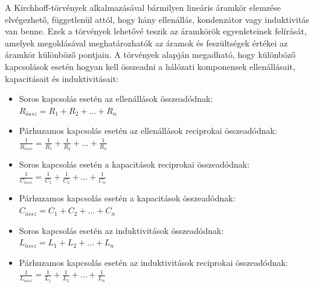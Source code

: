 \documentclass[../main.tex]{subfiles}
\begin{document}
A Kirchhoff-törvények alkalmazásával bármilyen lineáris áramkör elemzése elvégezhető, függetlenül attól, hogy hány ellenállás, kondenzátor vagy induktivitás van benne. Ezek a törvények lehetővé teszik az áramkörök egyenleteinek felírását, amelyek megoldásával meghatározhatók az áramok és feszültségek értékei az áramkör különböző pontjain.
A törvények alapján megadható, hogy különböző kapcsolások esetén hogyan kell összeadni a hálózati komponensek ellenállásait, kapacitásait és induktivitásait:
\begin{itemize}
    \item Soros kapcsolás esetén az ellenállások összeadódnak: $R_{össz} = R_1 + R_2 + \ldots + R_n$
    \item Párhuzamos kapcsolás esetén az ellenállások reciprokai összeadódnak: $\frac{1}{R_{össz}} = \frac{1}{R_1} + \frac{1}{R_2} + \ldots + \frac{1}{R_n}$
    \item Soros kapcsolás esetén a kapacitások reciprokai összeadódnak: $\frac{1}{C_{össz}} = \frac{1}{C_1} + \frac{1}{C_2} + \ldots + \frac{1}{C_n}$
    \item Párhuzamos kapcsolás esetén a kapacitások összeadódnak: $C_{össz} = C_1 + C_2 + \ldots + C_n$
    \item Soros kapcsolás esetén az induktivitások összeadódnak: $L_{össz} = L_1 + L_2 + \ldots + L_n$
    \item Párhuzamos kapcsolás esetén az induktivitások reciprokai összeadódnak: $\frac{1}{L_{össz}} = \frac{1}{L_1} + \frac{1}{L_2} + \ldots + \frac{1}{L_n}$
\end{itemize}
\end{document}
